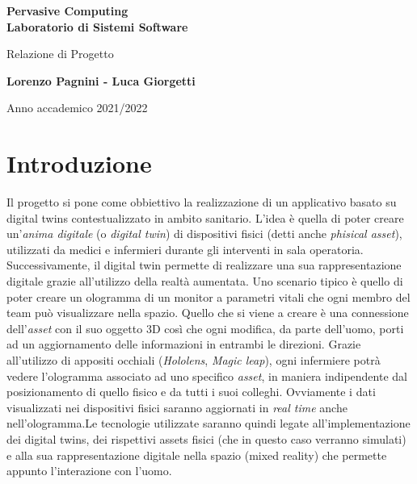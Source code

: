 \documentclass{report}
\begin{document}
\hypersetup{linkcolor=black}

\tableofcontents

\begin{titlepage}
    \begin{center}
        \vspace*{1cm}
        
        \Huge
        \textbf{Pervasive Computing \\ Laboratorio di Sistemi Software}
        
        \vspace{0.5cm}
        \LARGE
        Relazione di Progetto
        
        \vspace{1.0cm}
        \textbf{Lorenzo Pagnini - Luca Giorgetti}
        
        \vspace{1.5cm}
        
        \vspace{0.5cm}
        \LARGE
        Anno accademico 2021/2022
    
    \end{center}
\end{titlepage}

\chapter{Introduzione}
Il progetto si pone come obbiettivo la realizzazione di un applicativo basato su digital twins contestualizzato in ambito sanitario. L'idea è quella di poter creare un'\textit{anima digitale} (o \textit{digital twin}) di dispositivi fisici (detti anche \textit{phisical asset}), utilizzati da medici e infermieri durante gli interventi in sala operatoria. Successivamente, il digital twin permette di realizzare una sua rappresentazione digitale grazie all'utilizzo della realtà aumentata. Uno scenario tipico è quello di poter creare un ologramma di un monitor a parametri vitali che ogni membro del team può visualizzare nella spazio. Quello che si viene a creare è una connessione dell'\textit{asset} con il suo oggetto 3D così che ogni modifica, da parte dell'uomo, porti ad un aggiornamento delle informazioni in entrambi le direzioni. Grazie all'utilizzo di appositi occhiali (\textit{Hololens}, \textit{Magic leap}), ogni infermiere potrà vedere l'ologramma associato ad uno specifico \textit{asset}, in maniera indipendente dal posizionamento di quello fisico e da tutti i suoi colleghi. Ovviamente i dati visualizzati nei dispositivi fisici saranno aggiornati in \textit{real time} anche nell'ologramma.\newline \newline Le tecnologie utilizzate saranno quindi legate all'implementazione dei digital twins, dei rispettivi assets fisici (che in questo caso verranno simulati) e alla sua rappresentazione digitale nella spazio (mixed reality) che permette appunto l'interazione con l'uomo.
\end{document}
